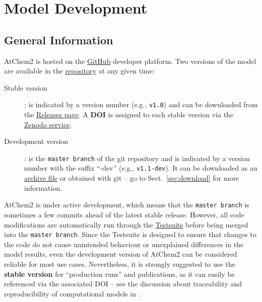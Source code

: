 %
%
%
%

\chapter{Model Development} \label{ch:development}

\section{General Information} \label{sec:general-information}

AtChem2 is hosted on the \href{https://github.com}{GitHub} developer platform. Two versions of
the model are available in the \href{https://github.com/AtChem/AtChem2}{repository} at any
given time:

\begin{description}
\item[Stable version]: is indicated by a version number (e.g., \texttt{v1.0}) and can be
  downloaded from the \href{https://github.com/AtChem/AtChem2/releases}{Releases page}. A
  \textbf{DOI} is assigned to each stable version via the \href{https://zenodo.org}{Zenodo
    service}.
\item[Development version]: is the \texttt{master\ branch} of the git repository and is
  indicated by a version number with the suffix ``-dev'' (e.g., \texttt{v1.1-dev}). It can be
  downloaded as an \href{https://github.com/AtChem/AtChem2/archive/master.zip}{archive file} or
  obtained with git -- go to Sect.~\ref{sec:download} for more information.
\end{description}

AtChem2 is under active development, which means that the \texttt{master\ branch} is sometimes
a few commits ahead of the latest stable release. However, all code modifications are
automatically run through the \hyperref[sec:testsuite]{Testsuite} before being merged into the
\texttt{master\ branch}. Since the Testsuite is designed to ensure that changes to the code do
not cause unintended behaviour or unexplained differences in the model results, even the
development version of AtChem2 can be considered reliable for most use cases. Nevertheless, it
is strongly suggested to use the \textbf{stable version} for ``production runs'' and
publications, as it can easily be referenced via the associated DOI -- see the discussion about
traceability and reproducibility of computational models in \citet{sommariva_2020}.

